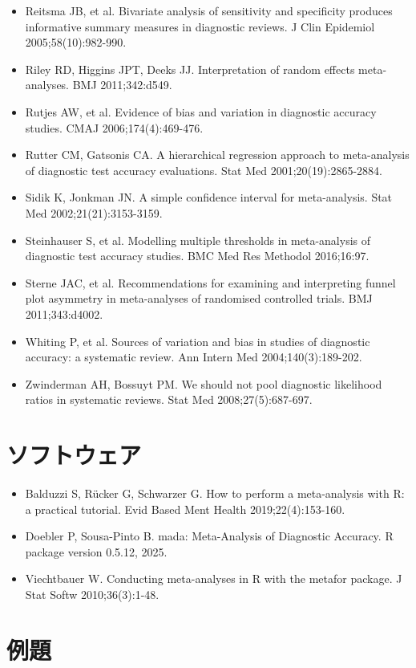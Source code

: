 \begin{itemize}
\item Reitsma JB, et al. Bivariate analysis of sensitivity and specificity produces informative summary measures in diagnostic reviews. J Clin Epidemiol 2005;58(10):982-990.
\item Riley RD, Higgins JPT, Deeks JJ. Interpretation of random effects meta-analyses. BMJ 2011;342:d549.
\item Rutjes AW, et al. Evidence of bias and variation in diagnostic accuracy studies. CMAJ 2006;174(4):469-476.
\item Rutter CM, Gatsonis CA. A hierarchical regression approach to meta-analysis of diagnostic test accuracy evaluations. Stat Med 2001;20(19):2865-2884.
\item Sidik K, Jonkman JN. A simple confidence interval for meta-analysis. Stat Med 2002;21(21):3153-3159.
\item Steinhauser S, et al. Modelling multiple thresholds in meta-analysis of diagnostic test accuracy studies. BMC Med Res Methodol 2016;16:97.
\item Sterne JAC, et al. Recommendations for examining and interpreting funnel plot asymmetry in meta-analyses of randomised controlled trials. BMJ 2011;343:d4002.
\item Whiting P, et al. Sources of variation and bias in studies of diagnostic accuracy: a systematic review. Ann Intern Med 2004;140(3):189-202.
\item Zwinderman AH, Bossuyt PM. We should not pool diagnostic likelihood ratios in systematic reviews. Stat Med 2008;27(5):687-697.
\end{itemize}

\section{ソフトウェア}
\label{sec:C-4}

\begin{itemize}
\item Balduzzi S, Rücker G, Schwarzer G. How to perform a meta-analysis with R: a practical tutorial. Evid Based Ment Health 2019;22(4):153-160.
\item Doebler P, Sousa-Pinto B. mada: Meta-Analysis of Diagnostic Accuracy. R package version 0.5.12, 2025.
\item Viechtbauer W. Conducting meta-analyses in R with the metafor package. J Stat Softw 2010;36(3):1-48.
\end{itemize}

\section{例題}
\label{sec:C-5}

